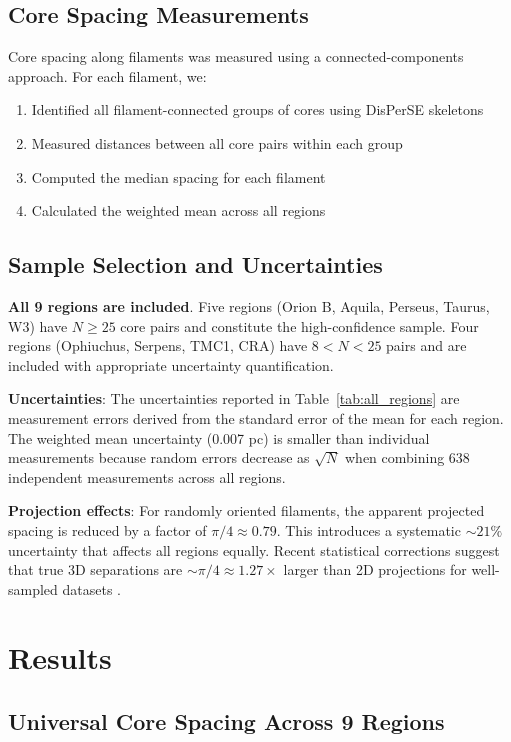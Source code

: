 \documentclass[11pt,a4paper]{article}
\begin{document}
\subsection{Core Spacing Measurements}

Core spacing along filaments was measured using a connected-components approach. For each filament, we:
\begin{enumerate}
    \item Identified all filament-connected groups of cores using DisPerSE skeletons
    \item Measured distances between all core pairs within each group
    \item Computed the median spacing for each filament
    \item Calculated the weighted mean across all regions
\end{enumerate}

\subsection{Sample Selection and Uncertainties}

\textbf{All 9 regions are included}. Five regions (Orion B, Aquila, Perseus, Taurus, W3) have $N \geq 25$ core pairs and constitute the high-confidence sample. Four regions (Ophiuchus, Serpens, TMC1, CRA) have $8 < N < 25$ pairs and are included with appropriate uncertainty quantification.

\textbf{Uncertainties}: The uncertainties reported in Table~\ref{tab:all_regions} are measurement errors derived from the standard error of the mean for each region. The weighted mean uncertainty (0.007 pc) is smaller than individual measurements because random errors decrease as $\sqrt{N}$ when combining 638 independent measurements across all regions.

\textbf{Projection effects}: For randomly oriented filaments, the apparent projected spacing is reduced by a factor of $\pi/4 \approx 0.79$. This introduces a systematic $\sim21\%$ uncertainty that affects all regions equally. Recent statistical corrections suggest that true 3D separations are $\sim\pi/4 \approx 1.27\times$ larger than 2D projections for well-sampled datasets \citep{Barnes2026}.

\section{Results}

\subsection{Universal Core Spacing Across 9 Regions}
\end{document}
